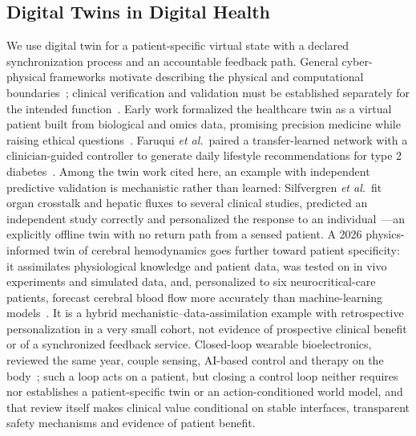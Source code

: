 \documentclass[journal]{IEEEtran}
\begin{document}
\subsection{Digital Twins in Digital Health}
We use digital twin for a patient-specific virtual state with a declared synchronization process and an accountable feedback path. General cyber-physical frameworks motivate describing the physical and computational boundaries~\cite{NIST2021}; clinical verification and validation must be established separately for the intended function~\cite{Sel2025VVUQ}. Early work formalized the healthcare twin as a virtual patient built from biological and omics data, promising precision medicine while raising ethical questions~\cite{Bruynseels2018DigitalTwins}. Faruqui \emph{et al.}\ paired a transfer-learned network with a clinician-guided controller to generate daily lifestyle recommendations for type 2 diabetes~\cite{Faruqui2024}. Among the twin work cited here, an example with independent predictive validation is mechanistic rather than learned: Silfvergren \emph{et al.}\ fit organ crosstalk and hepatic fluxes to several clinical studies, predicted an independent study correctly and personalized the response to an individual~\cite{Silfvergren2022}---an explicitly offline twin with no return path from a sensed patient. A 2026 physics-informed twin of cerebral hemodynamics goes further toward patient specificity: it assimilates physiological knowledge and patient data, was tested on in vivo experiments and simulated data, and, personalized to six neurocritical-care patients, forecast cerebral blood flow more accurately than machine-learning models~\cite{briggs2026cerebral}. It is a hybrid mechanistic--data-assimilation example with retrospective personalization in a very small cohort, not evidence of prospective clinical benefit or of a synchronized feedback service. Closed-loop wearable bioelectronics, reviewed the same year, couple sensing, AI-based control and therapy on the body~\cite{gao2026closedloop}; such a loop acts on a patient, but closing a control loop neither requires nor establishes a patient-specific twin or an action-conditioned world model, and that review itself makes clinical value conditional on stable interfaces, transparent safety mechanisms and evidence of patient benefit.
\end{document}
